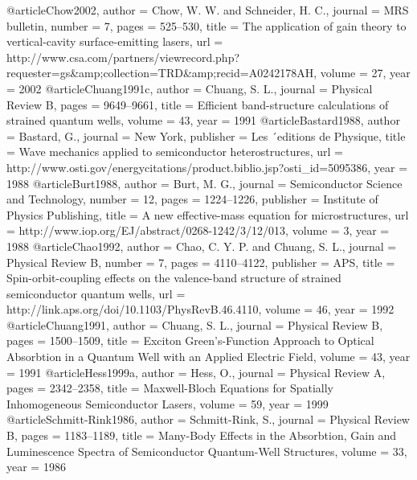@article{Chow2002,
author = {Chow, W. W. and Schneider, H. C.},
journal = {MRS bulletin},
number = {7},
pages = {525--530},
title = {{The application of gain theory to vertical-cavity surface-emitting lasers}},
url = {http://www.csa.com/partners/viewrecord.php?requester=gs\&amp;collection=TRD\&amp;recid=A0242178AH},
volume = {27},
year = {2002}
}
@article{Chuang1991c,
author = {Chuang, S. L.},
journal = {Physical Review B},
pages = {9649--9661},
title = {{Efficient band-structure calculations of strained quantum wells}},
volume = {43},
year = {1991}
}
@article{Bastard1988,
author = {Bastard, G.},
journal = {New York},
publisher = {Les ´editions de Physique},
title = {{Wave mechanics applied to semiconductor heterostructures}},
url = {http://www.osti.gov/energycitations/product.biblio.jsp?osti\_id=5095386},
year = {1988}
}
@article{Burt1988,
author = {Burt, M. G.},
journal = {Semiconductor Science and Technology},
number = {12},
pages = {1224--1226},
publisher = {Institute of Physics Publishing},
title = {{A new effective-mass equation for microstructures}},
url = {http://www.iop.org/EJ/abstract/0268-1242/3/12/013},
volume = {3},
year = {1988}
}
@article{Chao1992,
author = {Chao, C. Y. P. and Chuang, S. L.},
journal = {Physical Review B},
number = {7},
pages = {4110--4122},
publisher = {APS},
title = {{Spin-orbit-coupling effects on the valence-band structure of strained semiconductor quantum wells}},
url = {http://link.aps.org/doi/10.1103/PhysRevB.46.4110},
volume = {46},
year = {1992}
}
@article{Chuang1991,
author = {Chuang, S. L.},
journal = {Physical Review B},
pages = {1500--1509},
title = {{Exciton Green’s-Function Approach to Optical Absorbtion in a Quantum Well with an Applied Electric Field}},
volume = {43},
year = {1991}
}
@article{Hess1999a,
author = {Hess, O.},
journal = {Physical Review A},
pages = {2342--2358},
title = {{Maxwell-Bloch Equations for Spatially Inhomogeneous Semiconductor Lasers}},
volume = {59},
year = {1999}
}
@article{Schmitt-Rink1986,
author = {Schmitt-Rink, S.},
journal = {Physical Review B},
pages = {1183--1189},
title = {{Many-Body Effects in the Absorbtion, Gain and Luminescence Spectra of Semiconductor Quantum-Well Structures}},
volume = {33},
year = {1986}
}
